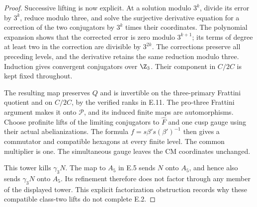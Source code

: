 \begin{proof}
Successive lifting is now explicit. At a solution modulo $3^k$,
divide its error by $3^k$, reduce modulo three, and solve the
surjective derivative equation for a correction of the two
conjugators by $3^k$ times their coordinates. The polynomial
expansion shows that the corrected error is zero modulo
$3^{k+1}$; its terms of degree at least two in the correction are
divisible by $3^{2k}$. The corrections preserve all preceding
levels, and the derivative retains the same reduction modulo
three. Induction gives convergent conjugators over $\Z_3$.
Their component in $C/2C$ is kept fixed throughout.

The resulting map preserves $Q$ and is invertible on the
three-primary Frattini quotient and on $C/2C$, by the verified
ranks in E.11. The pro-three Frattini argument makes it onto
$\mathcal P$, and its induced finite maps are automorphisms.
Choose profinite lifts of the limiting conjugators to $\widehat F$
and one cusp gauge using their actual abelianizations. The formula
$f=s\beta's(\beta')^{-1}$ then gives a commutator and compatible
hexagons at every finite level. The common multiplier is one.
The simultaneous gauge leaves the CM coordinates unchanged.

This tower kills $\gamma_3N$. The map to $A_5$ in E.5 sends $N$
onto $A_5$, and hence also sends $\gamma_3N$ onto $A_5$.
Its refinement therefore does not factor through any member of
the displayed tower. This explicit factorization obstruction
records why these compatible class-two lifts do not complete E.2.
\end{proof}

